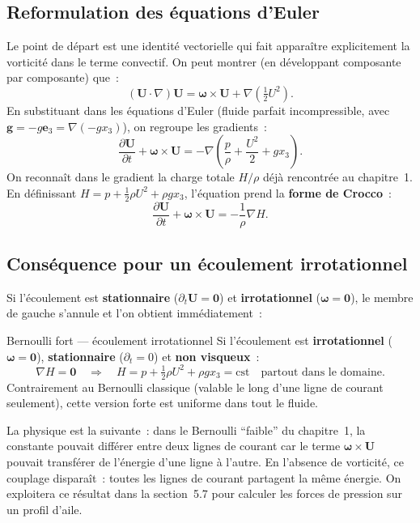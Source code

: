 \documentclass[11pt,a4paper]{report}
\newcommand{\pd}[2]{\dfrac{\partial #1}{\partial #2}}
\begin{document}
\subsection{Reformulation des \'equations d'Euler}

Le point de d\'epart est une identit\'e vectorielle qui fait appara\^itre explicitement
la vorticit\'e dans le terme convectif. On peut montrer (en d\'eveloppant composante par
composante) que~:
\[
  (\bm{U}\cdot\nabla)\bm{U} = \boldsymbol{\omega} \times \bm{U}
  + \nabla\!\left(\tfrac{1}{2}U^2\right).
\]
En substituant dans les \'equations d'Euler (fluide parfait incompressible, avec
$\bm{g} = -g\bm{e}_3 = \nabla(-gx_3)$), on regroupe les gradients~:
\[
  \pd{\bm{U}}{t} + \boldsymbol{\omega}\times\bm{U}
  = -\nabla\!\left(\frac{p}{\rho} + \frac{U^2}{2} + gx_3\right).
\]
On reconna\^it dans le gradient la charge totale $H/\rho$ d\'ej\`a rencontr\'ee au
chapitre~1. En d\'efinissant $H = p + \tfrac{1}{2}\rho U^2 + \rho g x_3$, l'\'equation
prend la \textbf{forme de Crocco}~:
\[
  \pd{\bm{U}}{t} + \boldsymbol{\omega}\times\bm{U}
  = -\frac{1}{\rho}\nabla H.
\]

\subsection{Cons\'equence pour un \'ecoulement irrotationnel}

Si l'\'ecoulement est \textbf{stationnaire} ($\partial_t\bm{U} = \bm{0}$) et
\textbf{irrotationnel} ($\boldsymbol{\omega} = \bm{0}$), le membre de gauche s'annule
et l'on obtient imm\'ediatement~:

\begin{importantbox}{Bernoulli fort --- \'ecoulement irrotationnel}
Si l'\'ecoulement est \textbf{irrotationnel} ($\boldsymbol{\omega}=\bm{0}$),
\textbf{stationnaire} ($\partial_t=0$) et \textbf{non visqueux}~:
\[
  \nabla H = \bm{0} \quad \Longrightarrow \quad
  H = p + \tfrac{1}{2}\rho U^2 + \rho g x_3 = \mathrm{cst} \quad \text{partout dans le domaine.}
\]
Contrairement au Bernoulli classique (valable le long d'une ligne de courant seulement),
cette version forte est uniforme dans tout le fluide.
\end{importantbox}

La physique est la suivante~: dans le Bernoulli ``faible'' du chapitre~1, la constante
pouvait diff\'erer entre deux lignes de courant car le terme $\boldsymbol{\omega}\times\bm{U}$
pouvait transf\'erer de l'\'energie d'une ligne \`a l'autre. En l'absence de vorticit\'e,
ce couplage dispara\^it~: toutes les lignes de courant partagent la m\^eme \'energie. On
exploitera ce r\'esultat dans la section~5.7 pour calculer les forces de pression sur un
profil d'aile.
\end{document}
